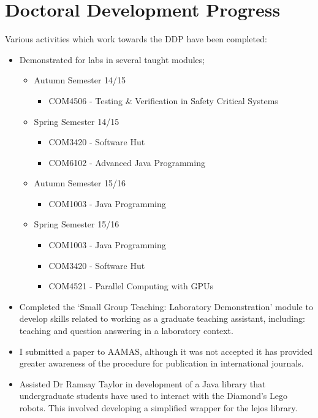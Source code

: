 \newpage
\chapter{Doctoral Development Progress\label{appendix:b}}
Various activities which work towards the DDP have been completed:
\begin{itemize}
  \item Demonstrated for labs in several taught modules;
  \begin{itemize}
    \item Autumn Semester 14/15
    \begin{itemize}
      \item COM4506 - Testing \& Verification in Safety Critical Systems
    \end{itemize}
    \item Spring Semester 14/15
    \begin{itemize}
      \item COM3420 - Software Hut
      \item COM6102 - Advanced Java Programming
    \end{itemize}
    \item Autumn Semester 15/16
    \begin{itemize}
      \item COM1003 - Java Programming
    \end{itemize}
    \item Spring Semester 15/16
    \begin{itemize}
      \item COM1003 - Java Programming
      \item COM3420 - Software Hut
      \item COM4521 - Parallel Computing with GPUs
    \end{itemize}
  \end{itemize}
  \item Completed the `Small Group Teaching: Laboratory Demonstration' module to develop skills related to working as a graduate teaching assistant, including: teaching and question answering in a laboratory context.
  \item I submitted a paper to AAMAS, although it was not accepted it has provided greater awareness of the procedure for publication in international journals.
  \item Assisted Dr Ramsay Taylor in development of a Java library that undergraduate students have used to interact with the Diamond's Lego robots. This involved developing a simplified wrapper for the lejos library.

\end{itemize}
